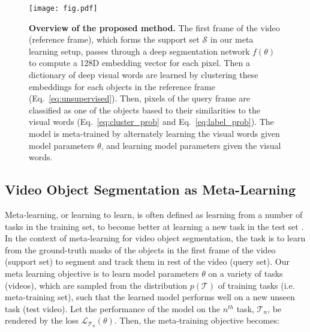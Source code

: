 \documentclass[10pt,twocolumn,letterpaper]{article}
\begin{document}
\begin{figure*}[t!]
	\centering
	\texttt{[image: fig.pdf]}
	\caption{{\bf Overview of the proposed method.} The first frame of the video (reference frame), which forms the support set $\mathcal{S}$ in our meta learning setup, passes through a deep segmentation network $f(\theta)$ to compute a 128D embedding vector for each pixel. Then a dictionary of deep visual words are learned by clustering these embeddings for each objects in the reference frame (Eq.~\ref{eq:unsupervised}). Then, pixels of the query frame are classified as one of the objects based to their similarities to the visual words (Eq.~\ref{eq:cluster_prob} and Eq.~\ref{eq:label_prob}). The model is meta-trained by alternately learning the visual words given model parameters $\theta$, and learning model parameters given the visual words.}
	\label{fig:ourmodel}   
\end{figure*}\subsection{Video Object Segmentation as Meta-Learning}\label{sec:metaformulation}%

Meta-learning, or learning to learn, is often defined as learning from a number of tasks in the training set, to become better at learning a new task in the test set \cite{MAML, NIPS2017_6996}.
In the context of meta-learning for video object segmentation, the task is to learn from the ground-truth masks of the objects in the first frame of the video (support set) to segment and track them in rest of the video (query set).
Our meta learning objective is to learn model parameters $\theta$ on a variety of tasks (videos), which are sampled from the distribution $p(\mathcal{T})$ of training tasks (i.e. meta-training set), such that the learned model performs well on a new unseen task (test video).
Let the performance of the model on the $n^{th}$ task, $\mathcal{T}_n$, be rendered by the loss $\mathcal{L}_{\mathcal{T}_n}(\theta)$. 
Then, the meta-training objective becomes:
\end{document}
